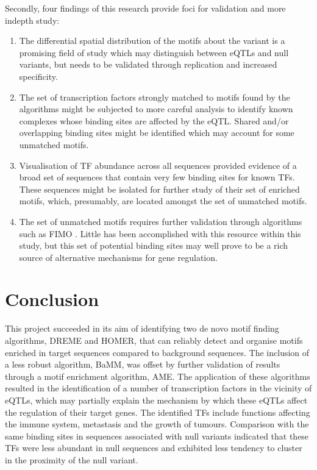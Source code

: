 \documentclass[12pt]{article}
\begin{document}
Secondly, four findings of this research provide foci for validation and more indepth study:
\begin{enumerate}
\item The differential spatial distribution of the motifs about the variant is a promising field of study which may distinguish between eQTLs and null variants, but needs to be validated through replication and increased specificity.

\item The set of transcription factors strongly matched to motifs found by the algorithms might be subjected to more careful analysis to identify known complexes whose binding sites are affected by the eQTL. Shared and/or overlapping binding sites might be identified which may account for some unmatched motifs.

\item Visualisation of TF abundance across all sequences provided evidence of a broad set of sequences that contain very few binding sites for known TFs. These sequences might be isolated for further study of their set of enriched motifs, which, presumably, are located amongst the set of unmatched motifs.

\item The set of unmatched motifs requires further validation through algorithms such as FIMO \citep{Grant2011}. Little has been accomplished with this resource within this study, but this set of potential binding sites may well prove to be a rich source of alternative mechanisms for gene regulation. 
\end{enumerate}

\section{Conclusion}

This project succeeded in its aim of identifying two de novo motif finding algorithms, DREME and HOMER, that can reliably detect and organise motifs enriched in target sequences compared to background sequences. The inclusion of a less robust algorithm, BaMM, was offset by further validation of results through a motif enrichment algorithm, AME. The application of these algorithms resulted in the identification of a number of transcription factors in the vicinity of eQTLs, which may partially explain the mechanism by which these eQTLs affect the regulation of their target genes. The identified TFs include functions affecting the immune system, metastasis and the growth of tumours. Comparison with the same binding sites in sequences associated with null variants indicated that these TFs were less abundant in null sequences and exhibited less tendency to cluster in the proximity of the null variant. 
\end{document}
